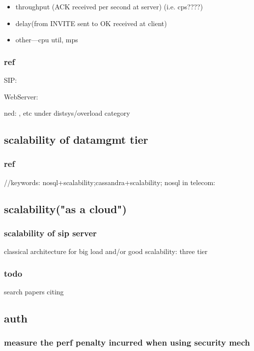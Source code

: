 \documentclass[•]{article}
\begin{document}
\begin{itemize}
\item throughput (ACK received per second at server) (i.e. cps????)
\item delay(from INVITE sent to OK received at client)
\item other---cpu util, mps
\end{itemize}

\subsubsection{ref}
SIP: \cite{Hilt2008}

WebServer: \cite{Iyer}

ned: \cite{Hong2010}, etc under distsys/overload category

\subsection{scalability of datamgmt tier}

\subsubsection{ref}
//keywords: nosql+scalability;cassandra+scalability;
nosql in telecom:\cite{Cruz2011}

\subsection{scalability("as a cloud")}
\subsubsection{scalability of sip server}
classical architecture for big load and/or good scalability: three tier \cite{Kim2011}

\subsubsection{todo}
search papers citing \cite{Vaquero2011}

\subsection{auth}

\subsubsection{measure the perf penalty incurred when using security mech}
\end{document}
